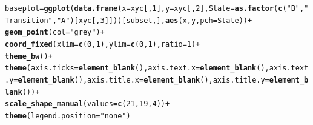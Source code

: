 \documentclass{article}\usepackage[]{graphicx}\usepackage[]{color}
\makeatletter
\newcommand{\hlnum}[1]{\textcolor[rgb]{0.686,0.059,0.569}{#1}}%
\newcommand{\hlstr}[1]{\textcolor[rgb]{0.192,0.494,0.8}{#1}}%
\newcommand{\hlopt}[1]{\textcolor[rgb]{0,0,0}{#1}}%
\newcommand{\hlstd}[1]{\textcolor[rgb]{0.345,0.345,0.345}{#1}}%
\newcommand{\hlkwb}[1]{\textcolor[rgb]{0.69,0.353,0.396}{#1}}%
\newcommand{\hlkwc}[1]{\textcolor[rgb]{0.333,0.667,0.333}{#1}}%
\newcommand{\hlkwd}[1]{\textcolor[rgb]{0.737,0.353,0.396}{\textbf{#1}}}%
\newenvironment{kframe}{%
 \def\at@end@of@kframe{}%
 \ifinner\ifhmode%
  \def\at@end@of@kframe{\end{minipage}}%
  \begin{minipage}{\columnwidth}%
 \fi\fi%
 \def\FrameCommand##1{\hskip\@totalleftmargin \hskip-\fboxsep
 \colorbox{shadecolor}{##1}\hskip-\fboxsep
     \hskip-\linewidth \hskip-\@totalleftmargin \hskip\columnwidth}%
 \MakeFramed {\advance\hsize-\width
   \@totalleftmargin\z@ \linewidth\hsize
   \@setminipage}}%
 {\par\unskip\endMakeFramed%
 \at@end@of@kframe}
\newenvironment{knitrout}{}{} %
\makeatother
\begin{document}
\begin{knitrout}
\color{fgcolor}\begin{kframe}
\begin{alltt}
\hlstd{baseplot} \hlkwb{=} \hlkwd{ggplot}\hlstd{(}\hlkwd{data.frame}\hlstd{(}\hlkwc{x} \hlstd{= xyc[,}\hlnum{1}\hlstd{],} \hlkwc{y} \hlstd{= xyc[,}\hlnum{2}\hlstd{],} \hlkwc{State} \hlstd{=} \hlkwd{as.factor}\hlstd{(}\hlkwd{c}\hlstd{(}\hlstr{"B"}\hlstd{,} \hlstr{"Transition"}\hlstd{,} \hlstr{"A"}\hlstd{)[xyc[,}\hlnum{3}\hlstd{]]))[subset,],} \hlkwd{aes}\hlstd{(x, y,} \hlkwc{pch} \hlstd{= State))} \hlopt{+}
        \hlkwd{geom_point}\hlstd{(}\hlkwc{col} \hlstd{=} \hlstr{"grey"}\hlstd{)} \hlopt{+}
        \hlkwd{coord_fixed}\hlstd{(}\hlkwc{xlim} \hlstd{=} \hlkwd{c}\hlstd{(}\hlnum{0}\hlstd{,} \hlnum{1}\hlstd{),} \hlkwc{ylim} \hlstd{=} \hlkwd{c}\hlstd{(}\hlnum{0}\hlstd{,} \hlnum{1}\hlstd{),} \hlkwc{ratio} \hlstd{=} \hlnum{1}\hlstd{)} \hlopt{+}
        \hlkwd{theme_bw}\hlstd{()} \hlopt{+}
        \hlkwd{theme}\hlstd{(}\hlkwc{axis.ticks} \hlstd{=} \hlkwd{element_blank}\hlstd{(),} \hlkwc{axis.text.x} \hlstd{=} \hlkwd{element_blank}\hlstd{(),} \hlkwc{axis.text.y} \hlstd{=} \hlkwd{element_blank}\hlstd{(),} \hlkwc{axis.title.x} \hlstd{=} \hlkwd{element_blank}\hlstd{(),} \hlkwc{axis.title.y} \hlstd{=} \hlkwd{element_blank}\hlstd{())} \hlopt{+}
        \hlkwd{scale_shape_manual}\hlstd{(}\hlkwc{values} \hlstd{=} \hlkwd{c}\hlstd{(}\hlnum{21}\hlstd{,} \hlnum{19}\hlstd{,} \hlnum{4}\hlstd{))} \hlopt{+}
        \hlkwd{theme}\hlstd{(}\hlkwc{legend.position}\hlstd{=}\hlstr{"none"}\hlstd{)}



\end{alltt}
\end{kframe}
\end{knitrout}
\end{document}
